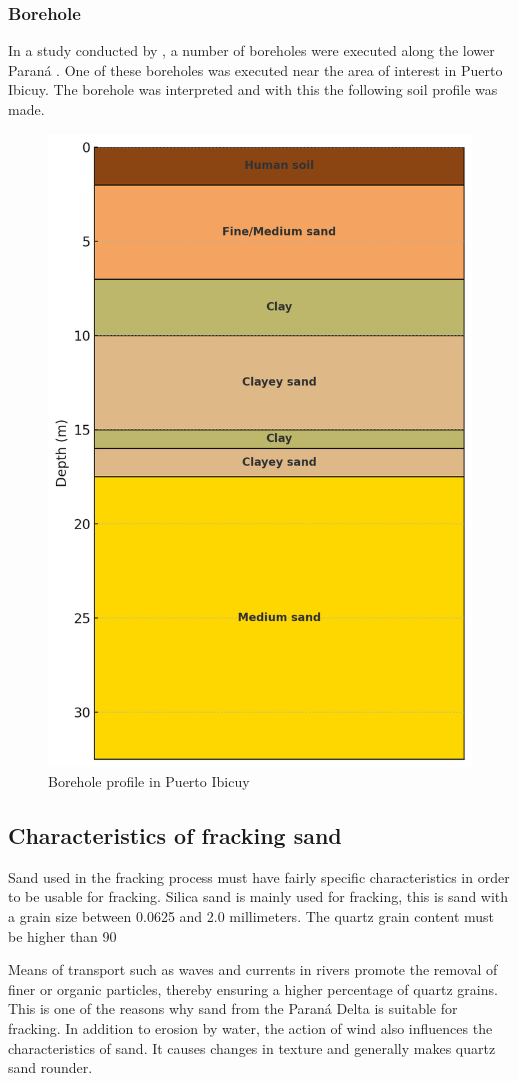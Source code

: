 \subsubsection{Borehole}
In a study conducted by \citeauthor{amatoEstratigrafiaCuaternariaSubsuelo2009}, a number of boreholes were executed along the lower Paraná \autocite{amatoEstratigrafiaCuaternariaSubsuelo2009}. One of these boreholes was executed near the area of interest in Puerto Ibicuy. The borehole was interpreted and with this the following soil profile was made.

\begin{figure}[H]
    \centering
    \includegraphics[width=0.45\linewidth]{figures//ch9/Bodemprofiel.png}
    \caption{Borehole profile in Puerto Ibicuy \autocite{amatoEstratigrafiaCuaternariaSubsuelo2009}}
    \label{fig:borehole}
\end{figure}

\subsection{Characteristics of fracking sand}
\label{sec:Charact. of fs}
Sand used in the fracking process must have fairly specific characteristics in order to be usable for fracking. Silica sand is mainly used for fracking, this is sand with a grain size between 0.0625 and 2.0 millimeters. The quartz grain content must be higher than 90%

Means of transport such as waves and currents in rivers promote the removal of finer or organic particles, thereby ensuring a higher percentage of quartz grains. This is one of the reasons why sand from the Paraná Delta is suitable for fracking.
In addition to erosion by water, the action of wind also influences the characteristics of sand. It causes changes in texture and generally makes quartz sand rounder. 

